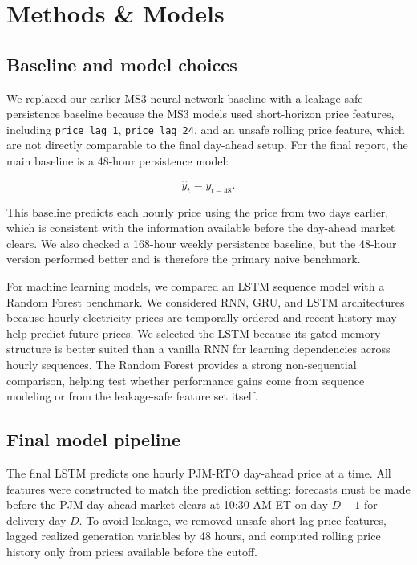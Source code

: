 \documentclass{article}
\begin{document}
\section{Methods \& Models}

\subsection{Baseline and model choices}

We replaced our earlier MS3 neural-network baseline with a leakage-safe persistence baseline because the MS3 models used short-horizon price features, including \texttt{price\_lag\_1}, \texttt{price\_lag\_24}, and an unsafe rolling price feature, which are not directly comparable to the final day-ahead setup. For the final report, the main baseline is a 48-hour persistence model:

\[
\hat{y}_t = y_{t-48}.
\]

This baseline predicts each hourly price using the price from two days earlier, which is consistent with the information available before the day-ahead market clears. We also checked a 168-hour weekly persistence baseline, but the 48-hour version performed better and is therefore the primary naive benchmark.

For machine learning models, we compared an LSTM sequence model with a Random Forest benchmark. We considered RNN, GRU, and LSTM architectures because hourly electricity prices are temporally ordered and recent history may help predict future prices. We selected the LSTM because its gated memory structure is better suited than a vanilla RNN for learning dependencies across hourly sequences. The Random Forest provides a strong non-sequential comparison, helping test whether performance gains come from sequence modeling or from the leakage-safe feature set itself.

\subsection{Final model pipeline}

The final LSTM predicts one hourly PJM-RTO day-ahead price at a time. All features were constructed to match the prediction setting: forecasts must be made before the PJM day-ahead market clears at 10:30 AM ET on day $D-1$ for delivery day $D$. To avoid leakage, we removed unsafe short-lag price features, lagged realized generation variables by 48 hours, and computed rolling price history only from prices available before the cutoff.
\end{document}

